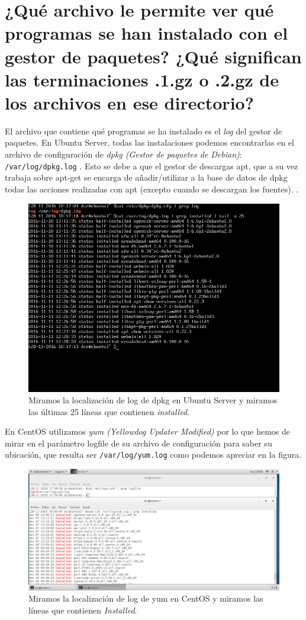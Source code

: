 \section{¿Qué archivo le permite ver qué programas se han instalado con el gestor de paquetes? ¿Qué significan las terminaciones .1.gz o .2.gz de los archivos en ese directorio?} 
El archivo que contiene qué programas se ha instalado es el \textit{log} del gestor de paquetes. En Ubuntu Server, todas las instalaciones podemos encontrarlas en el archivo de configuración de \textit{dpkg (Gestor de paquetes de Debian)}: \verb|/var/log/dpkg.log| \cite{c1a1}. Esto se debe a que el gestor de descargas apt, que a su vez trabaja sobre apt-get se encarga de añadir/utilizar a la base de datos de dpkg todas las acciones realizadas con apt (excepto cuando se descargan los fuentes). \cite{c1a2}.
\begin{figure}[H]
	\centering
	\includegraphics[scale=0.4]{dpkg-log.png}
	\caption{Miramos la localización de log de dpkg en Ubuntu Server y miramos las últimas 25 líneas que contienen \textit{installed}.}
\end{figure}

En CentOS utilizamos \textit{yum (Yellowdog Updater Modified)} por lo que hemos de mirar en el parámetro logfile de su archivo de configuración \cite{c1a3} para saber su ubicación, que resulta ser \verb|/var/log/yum.log| como podemos apreciar en la figura.
\begin{figure}[H]
	\centering
	\includegraphics[scale=0.4]{yum-log.png}
	\caption{Miramos la localización de log de yum en CentOS y miramos las líneas que contienen \textit{Installed}.}
\end{figure}

